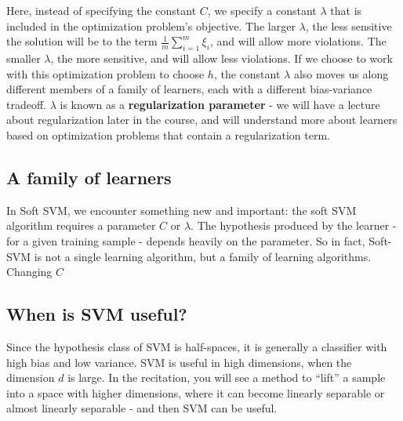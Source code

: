 \documentclass[11pt]{article}
\begin{document}
    Here, instead of specifying the constant $C$, we specify a constant
    $\lambda$ that is included in the optimization problem's objective. The
    larger $\lambda$, the less sensitive the solution will be to the term $\frac{1}{m}\sum_{i=1}^m
    \xi_i$, and will allow more violations. 
    The smaller $\lambda$, the more sensitive, and will allow less violations.
    If we choose to work with this optimization problem to choose $h$, the
    constant $\lambda$ also moves us along different members of a family of
    learners, each with a different bias-variance tradeoff. $\lambda$ is known
    as a {\bf regularization parameter} - we will have a lecture about
    regularization later in the course, and will understand more about learners
    based on optimization problems that contain a regularization term.


    \subsection{A family of learners}

    In Soft SVM, we encounter something new and important: the soft SVM
    algorithm requires a parameter $C$ or $\lambda$. The hypothesis produced by
    the learner - for a given training sample - depends heavily on the
    parameter. So in fact, Soft-SVM is not a single learning algorithm, but a
    family of learning algorithms. Changing $C$ 

    \subsection{When is SVM useful?}

    Since the hypothesis class of SVM is half-spaces, it is generally a
    classifier with high bias and low variance. SVM is useful in high
    dimensions, when the dimension $d$ is large. In the recitation, you will see
    a method to ``lift'' a sample into a space with higher dimensions, where it
    can become linearly separable or almost linearly separable - and then SVM
    can be useful.
\end{document}

